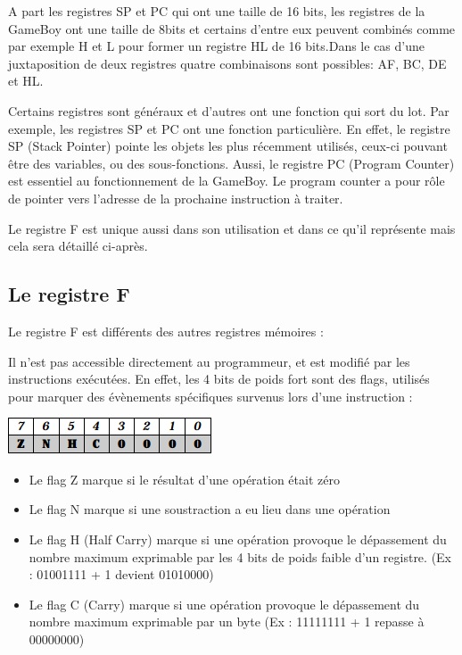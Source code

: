 \documentclass[12pt, a4paper]{article}
\begin{document}
A part les registres SP et PC qui ont une taille de 16 bits, les registres de la GameBoy ont une taille de 8bits et certains d'entre eux peuvent combinés comme par exemple H et L pour former un registre HL de 16 bits.Dans le cas d'une juxtaposition de deux registres quatre combinaisons sont possibles: AF, BC, DE et HL. 

Certains registres sont généraux et d'autres ont une fonction qui sort du lot. Par exemple, les registres SP et PC ont une fonction particulière. En effet, le registre SP (Stack Pointer) pointe les objets les plus récemment utilisés, ceux-ci pouvant être des variables, ou des sous-fonctions. Aussi, le registre PC (Program Counter) est essentiel au fonctionnement de la GameBoy. Le program counter a pour rôle de pointer vers l'adresse de la prochaine instruction à traiter.

Le registre F est unique aussi dans son utilisation et dans ce qu'il représente mais cela sera détaillé ci-après.

\pagebreak
\subsection{Le registre F}

Le registre F est différents des autres registres mémoires :

\bigskip
Il n'est pas accessible directement au programmeur, et est modifié par les instructions exécutées. En effet, les 4 bits de poids fort sont des flags, utilisés pour marquer des évènements spécifiques survenus lors d'une instruction :

\bigskip

\begin{center}
\includegraphics{Fregister.png}
\end{center}

\bigskip
\begin{itemize}
\item Le flag Z marque si le résultat d'une opération était zéro
\bigskip
\item Le flag N marque si une soustraction a eu lieu dans une opération
\bigskip
\item Le flag H (Half Carry) marque si une opération provoque le dépassement du nombre maximum exprimable par les 4 bits de poids faible d'un registre. (Ex : 01001111 + 1 devient 01010000)
\bigskip
\item Le flag C (Carry) marque si une opération provoque le dépassement du nombre maximum exprimable par un byte (Ex : 11111111 + 1 repasse à 00000000)
\end{itemize}
\end{document}

